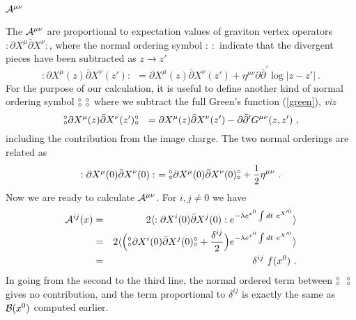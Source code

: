 \documentclass[a4paper,12pt]{article}
\def\p{\partial}
\def\pb{\bar{\partial}}
\def\no{{}^\circ \hspace{-0.16cm} {}_{\circ}}
\begin{document}
\subsubsection{${\cal A}^{\mu \nu}$}
The ${\cal A}^{\mu \nu}$ are proportional to expectation values of graviton vertex 
operators $:\p X^\mu \pb X^\nu:$, where the normal ordering symbol $: ~:$ indicate
that the divergent pieces have been subtracted as $z\rightarrow z'$
\begin{equation}
:\p X^\mu(z) \pb X^{\nu}(z'): ~~= \p X^\mu(z) \pb X^{\nu}(z') +\eta^{\mu \nu} \p \pb^\prime
\log|z-z'|~.
\end{equation}
For the purpose of our calculation, it is useful to define another kind of normal ordering symbol $\no ~\no$ where we subtract the full Green's function (\ref{green}), {\em viz} \begin{equation}
\no \p X^\mu(z) \pb X^{\nu}(z')\no ~~= \p X^\mu(z) \pb X^{\nu}(z') -\p \pb^\prime G^{\mu \nu} (z,z')~,
\end{equation}
including the contribution from the image charge. The two normal orderings are related 
as
\begin{equation}
:\p X^\mu(0) \pb X^\nu(0): ~= \no \p X^\mu(0) \pb X^\nu(0) \no + {1 \over 2} \eta^{\mu \nu}~. 
\end{equation}
Now we are ready to calculate ${\cal A}^{\mu \nu}$. 
For $i,j\neq 0$ we have
\begin{eqnarray} 
{\cal A}^{ij}(x) &=& 2 \langle :\p X^i(0) \pb X^j(0):  e^{-\lambda e^{x^0} \int dt ~e^{X'^0}}\rangle  
   \nonumber \\
& = &2\langle  \Bigl( \no \p X^i(0) \pb X^{j}(0) \no  +{ \delta^{ij} \over 2} \Bigr)
e^{-\lambda e^{x^0} \int dt ~e^{X'^0}}\rangle    \nonumber  \\
&=& \delta^{ij}~f(x^0)~.
\end{eqnarray}
In going from the second to the third line, the normal ordered term between $\no~~\no$ gives
no contribution, and the term proportional to $\delta^{ij}$ is exactly the same as ${\cal B}(x^0)$
computed earlier. 
\end{document}
